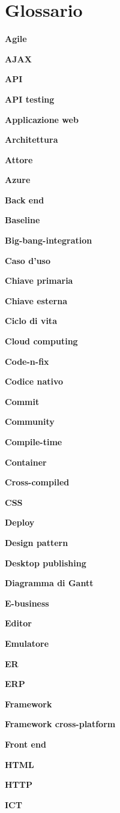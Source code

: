 \chapter{Glossario} \label{gloss}

\textbf{Agile}

\textbf{AJAX}

\textbf{API}

\textbf{API testing}

\textbf{Applicazione web}

\textbf{Architettura}

\textbf{Attore}

\textbf{Azure}

\textbf{Back end}

\textbf{Baseline}

\textbf{Big-bang-integration}

\textbf{Caso d'uso}

\textbf{Chiave primaria}

\textbf{Chiave esterna}

\textbf{Ciclo di vita}

\textbf{Cloud computing}

\textbf{Code-n-fix}

\textbf{Codice nativo}

\textbf{Commit}

\textbf{Community}

\textbf{Compile-time}

\textbf{Container}

\textbf{Cross-compiled}

\textbf{CSS}

\textbf{Deploy}

\textbf{Design pattern}

\textbf{Desktop publishing}

\textbf{Diagramma di Gantt}

\textbf{E-business}

\textbf{Editor}

\textbf{Emulatore}

\textbf{ER}

\textbf{ERP}

\textbf{Framework}

\textbf{Framework cross-platform}

\textbf{Front end}

\textbf{HTML}

\textbf{HTTP}

\textbf{ICT}

